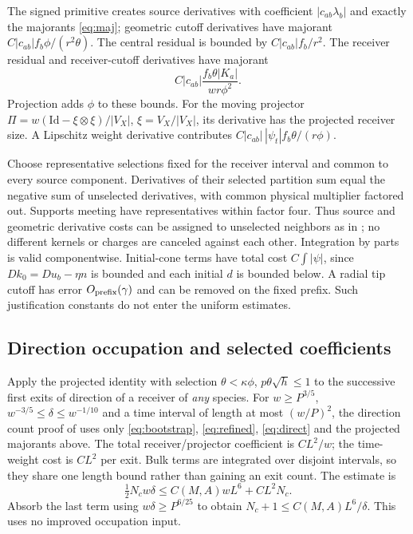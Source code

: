 \documentclass[11pt]{article}
\newcommand{\Id}{\mathrm{Id}}
\theoremstyle{remark}\newtheorem{remark}[theorem]{Remark}
\numberwithin{equation}{section}
\begin{document}
The signed primitive creates source derivatives with coefficient
$|c_{ab}\lambda_b|$ and exactly the majorants \eqref{eq:maj}; geometric
cutoff derivatives have majorant $C|c_{ab}|f_b\phi/(r^2\theta)$.
The central residual is bounded by $C|c_{ab}|f_b/r^2$.
The receiver residual and receiver-cutoff derivatives have majorant
\begin{equation}\label{eq:receiver-majorant}
 C|c_{ab}|\frac{f_b\theta|K_a|}{wr\phi^2}.
\end{equation}
Projection adds $\phi$ to these bounds. For the moving projector
$\Pi=w(\Id-\xi\otimes\xi)/|V_X|$, $\xi=V_X/|V_X|$,
its derivative has the projected receiver size.
A Lipschitz weight derivative contributes
$C|c_{ab}|\,|\psi_t|f_b\theta/(r\phi)$.

Choose representative selections fixed for the receiver interval and common
to every source component. Derivatives of their selected partition sum equal
the negative sum of unselected derivatives, with common physical multiplier
factored out. Supports meeting have representatives within factor four.
Thus source and geometric derivative costs can be assigned to unselected
neighbors as in \cite[Section 6]{OAI362}; no different kernels or charges
are canceled against each other. Integration by parts is valid componentwise.
Initial-cone terms have total cost $C\int|\psi|$, since $Dk_0=Du_b-\eta n$
is bounded and each initial $d$ is bounded below. A radial tip cutoff has
error $O_{\rm prefix}(\gamma)$ and can be removed on the fixed prefix.
Such justification constants do not enter the uniform estimates.

\subsection{Direction occupation and selected coefficients}
Apply the projected identity with selection
$\theta<\kappa\phi$, $p\theta\sqrt h\le1$ to the successive first exits
of direction of a receiver of \emph{any} species. For
$w\ge P^{3/5}$, $w^{-3/5}\le\delta\le w^{-1/10}$ and a time interval
of length at most $(w/P)^2$, the direction count proof of
\cite[Section 7]{OAI362} uses only \eqref{eq:bootstrap},
\eqref{eq:refined}, \eqref{eq:direct} and the projected majorants above.
The total receiver/projector coefficient is $CL^2/w$; the time-weight
cost is $CL^2$ per exit. Bulk terms are integrated over disjoint intervals,
so they share one length bound rather than gaining an exit count.
The estimate is
\[
 \tfrac12N_cw\delta\le C(M,A)wL^6+CL^2N_c.
\]
Absorb the last term using $w\delta\ge P^{6/25}$ to obtain
$N_c+1\le C(M,A)L^6/\delta$. This uses no improved occupation input.
\end{document}
